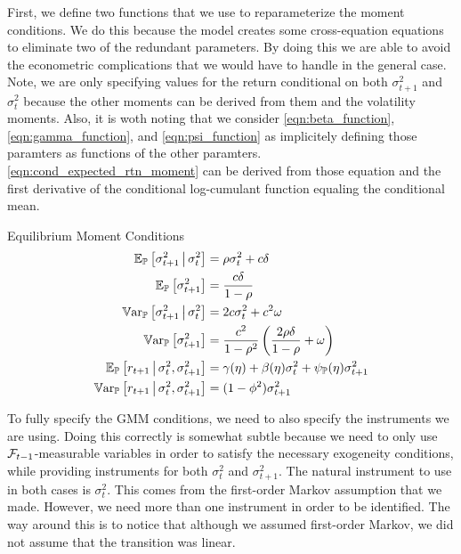 \documentclass[11pt, letterpaper, twoside, final]{article}
\begin{document}
First, we define two functions that we use to reparameterize the moment conditions.
We do this because the model creates some cross-equation equations to eliminate two of the redundant parameters.
By doing this we are able to avoid the econometric complications that we would have to handle in the general
case.
Note, we are only specifying values for the return conditional on both $\sigma^2_{t+1}$ and $\sigma^2_t$ because
the other moments can be derived from them and the volatility moments.
Also, it is woth noting that we consider \cref{eqn:beta_function}, \cref{eqn:gamma_function}, and
\cref{eqn:psi_function} as implicitely defining those paramters as functions of the other paramters.
\cref{eqn:cond_expected_rtn_moment} can be derived from those equation and the first derivative of the conditional
log-cumulant function equaling the conditional mean.


\begin{defn}{Equilibrium Moment Conditions}
    \label{defn:equilibrium_moment_conditions}
    \begin{align}
        \label{eqn:cond_vol_mean}
        \E_{\PP}\left[\sigma^2_{t+1} \mvert \sigma^2_t \right]  &= \rho \sigma^2_t  + c \delta\\
%
        \label{eqn:global_vol_mean}
        \E_{\PP}\left[\sigma^2_{t+1}\right]  &= \frac{c \delta}{1 - \rho} \\
%
        \label{eqn:cond_vol_var}
        \Var_{\PP}\left[\sigma^2_{t+1} \mvert \sigma^2_t \right]  &=  2 c \sigma^2_t  + c^2 \omega \\
%
        \label{eqn:global_vol_var}
        \Var_{\PP}\left[\sigma^2_{t+1} \right]  &=  \frac{c^2}{1 - \rho^2}  \left(\frac{2 \rho \delta}{1 - \rho}  +
        \omega \right)  \\
%
        \label{eqn:cond_expected_rtn_moment}
        \E_{\PP}\left[r_{t+1} \mvert \sigma^2_t, \sigma^2_{t+1}\right] &= \gamma(\eta) + \beta(\eta) \sigma^2_t +
        \psi_{\PP}(\eta) \sigma^2_{t+1} \\
%
        \label{eqn:cond_rtn_var}
        \Var_{\PP}\left[r_{t+1} \mvert \sigma^2_t, \sigma^2_{t+1}\right] &= (1 - \phi^2) \sigma^2_{t+1} 
\end{align}
\end{defn}

To fully specify the GMM conditions, we need to also specify the instruments we are using.
Doing this correctly is somewhat subtle because we need to only use $\mathcal{F}_{t-1}$-measurable variables in order to
satisfy the necessary exogeneity conditions, while providing instruments for both $\sigma^2_t$ and
$\sigma^2_{t+1}$. 
The natural instrument to use in both cases is $\sigma^2_t$.
This comes from the first-order Markov assumption that we made.
However, we need more than one instrument in order to be identified.
The way around this is to notice that although we assumed first-order Markov, we did not assume that the
transition was linear. 
\end{document}
